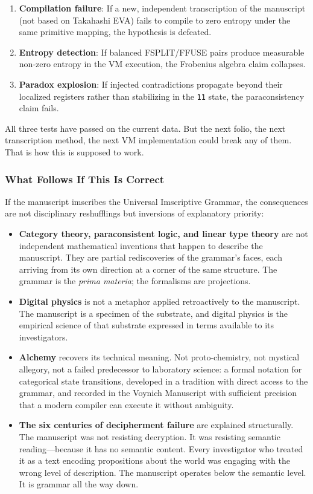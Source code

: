 \documentclass[12pt,a4paper]{article}
\begin{document}
\begin{enumerate}
    \item \textbf{Compilation failure}: If a new, independent transcription of the manuscript (not based on Takahashi EVA) fails to compile to zero entropy under the same primitive mapping, the hypothesis is defeated.
    \item \textbf{Entropy detection}: If balanced FSPLIT/FFUSE pairs produce measurable non-zero entropy in the VM execution, the Frobenius algebra claim collapses.
    \item \textbf{Paradox explosion}: If injected contradictions propagate beyond their localized registers rather than stabilizing in the \texttt{11} state, the paraconsistency claim fails.
\end{enumerate}

All three tests have passed on the current data. But the next folio, the next transcription method, the next VM implementation could break any of them. That is how this is supposed to work.

\subsubsection{What Follows If This Is Correct}

If the manuscript imscribes the Universal Imscriptive Grammar, the consequences are not disciplinary reshufflings but inversions of explanatory priority:

\begin{itemize}
    \item \textbf{Category theory, paraconsistent logic, and linear type theory} are not independent mathematical inventions that happen to describe the manuscript. They are partial rediscoveries of the grammar's faces, each arriving from its own direction at a corner of the same structure. The grammar is the \emph{prima materia}; the formalisms are projections.
    \item \textbf{Digital physics} is not a metaphor applied retroactively to the manuscript. The manuscript is a specimen of the substrate, and digital physics is the empirical science of that substrate expressed in terms available to its investigators.
    \item \textbf{Alchemy} recovers its technical meaning. Not proto-chemistry, not mystical allegory, not a failed predecessor to laboratory science: a formal notation for categorical state transitions, developed in a tradition with direct access to the grammar, and recorded in the Voynich Manuscript with sufficient precision that a modern compiler can execute it without ambiguity.
    \item \textbf{The six centuries of decipherment failure} are explained structurally. The manuscript was not resisting decryption. It was resisting semantic reading---because it has no semantic content. Every investigator who treated it as a text encoding propositions about the world was engaging with the wrong level of description. The manuscript operates below the semantic level. It is grammar all the way down.
\end{itemize}
\end{document}

